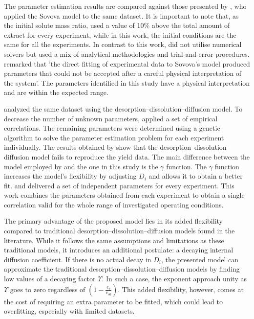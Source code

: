 \documentclass[a4paper,fleqn]{cas-dc}
\begin{document}
					The parameter estimation results are compared against those presented by \citet{Povh2001}, who applied the Sovova model to the same dataset. It is important to note that, as the initial solute mass ratio, \citet{Povh2001} used  a value of 10\% above the total amount of extract for every experiment, while in this work, the initial conditions are the same for all the experiments. In contrast to this work, \citet{Povh2001} did not utilise numerical solvers but used a mix of analytical methodologies and trial-and-error procedures. \citet{Povh2001} remarked that 'the direct fitting of experimental data to Sovova's model produced parameters that could not be accepted after a careful physical interpretation of the system'. The parameters identified in this study have a physical interpretation and are within the expected range.
					
					\citet{Rahimi2011} analyzed the same dataset using the desorption--dissolution--diffusion model. To decrease the number of unknown parameters, \citet{Rahimi2011} applied a set of empirical correlations. The remaining parameters were determined using a genetic algorithm to solve the parameter estimation problem for each experiment individually. The results obtained by \citet{Rahimi2011} show that the desorption--dissolution--diffusion model fails to reproduce the yield data. The main difference between the model employed by \citet{Rahimi2011} and the one in this study is the $\gamma$ function. The $\gamma$ function increases the model's flexibility by adjusting $D_i$ and allows it to obtain a better fit. \citet{Povh2001} and \citet{Rahimi2011} delivered a set of independent parameters for every experiment. This work combines the parameters obtained from each experiment to obtain a single correlation valid for the whole range of investigated operating conditions.
					
					The primary advantage of the proposed model lies in its added flexibility compared to traditional desorption--dissolution--diffusion models found in the literature. While it follows the same assumptions and limitations as these traditional models, it introduces an additional postulate: a decaying internal diffusion coefficient. If there is no actual decay in $D_i$, the presented model can approximate the traditional desorption--dissolution--diffusion models by finding low values of a decaying factor $\Upsilon$. In such a case, the exponent approach unity as $\Upsilon$ goes to zero regardless of $\left( 1 - \frac{c_s}{c_{s0}} \right)$. This added flexibility, however, comes at the cost of requiring an extra parameter to be fitted, which could lead to overfitting, especially with limited datasets.
					
\end{document}
